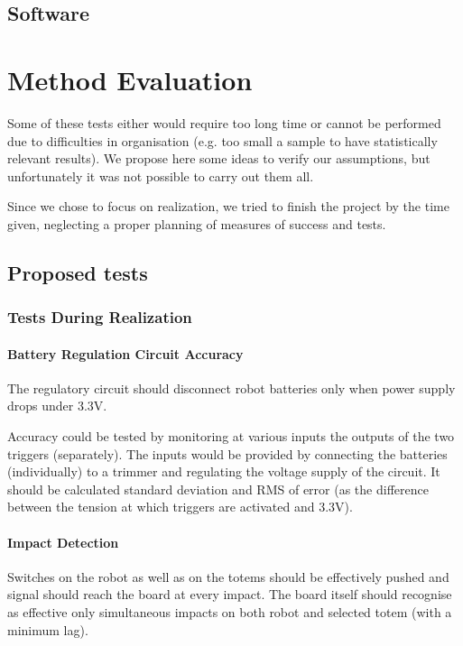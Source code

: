 \documentclass[a4paper,twoside]{book}
\newcommand{\includeDir}{include}
\begin{document}
\section{Software}
\label{sec:software}


\chapter{Method Evaluation}

Some of these tests either would require too long time or cannot be performed due to difficulties in organisation (e.g. too small a sample to have statistically relevant results). We propose here some ideas to verify our assumptions, but unfortunately it was not possible to carry out them all.

Since we chose to focus on realization, we tried to finish the project by the time given, neglecting a proper planning of measures of success and tests.

\section{Proposed tests}

\subsection{Tests During Realization}

\subsubsection*{Battery Regulation Circuit Accuracy}

The regulatory circuit should disconnect robot batteries only when power supply drops under 3.3V.

Accuracy could be tested by monitoring at various inputs the outputs of the two triggers (separately). The inputs would be provided by connecting the batteries (individually) to a trimmer and regulating the voltage supply of the circuit. It should be calculated standard deviation and RMS of error (as the difference between the tension at which triggers are activated and 3.3V).

\subsubsection*{Impact Detection}

Switches on the robot as well as on the totems should be effectively pushed and signal should reach the board at every impact.
The board itself should recognise as effective only simultaneous impacts on both robot and selected totem (with a minimum lag).
\end{document}
